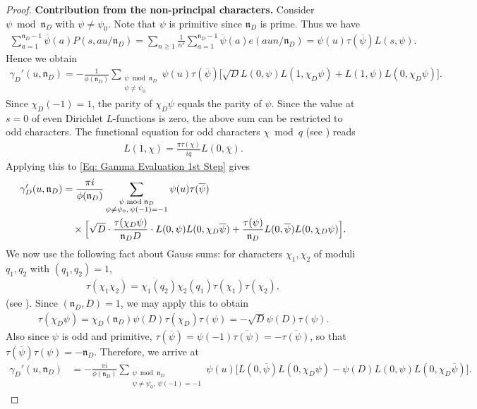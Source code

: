 \documentclass[11pt]{amsart}
\numberwithin{equation}{section}
\newcommand{\mf}{\mathfrak}
\newcommand{\ol}{\overline}
\newcommand{\n}{\mf{n}_D}
\theoremstyle{remark}
\begin{document}
\begin{proof}
\noindent \textbf{Contribution from the non-principal characters.} Consider $\psi \bmod \mf{n}_D$ with $\psi \neq \psi_0$. Note that $\psi$ is primitive since $\n$ is prime. Thus we have 
\begin{align}\label{Eq: Connecting P with Gauss Sums}
\sum_{a=1}^{\n-1}\ol{\psi}(a)P(s,au/\mf{n}_D)
=
\sum_{n\geq 1}\frac{1}{n^s}\sum_{a=1}^{\n-1}\ol{\psi}(a)e(aun/\n)
=
\psi(u)\tau(\ol{\psi})L(s,\psi).
\end{align}
Hence we obtain
\begin{align}\label{Eq: Gamma Evaluation 1st Step}
\gamma_D'(u,\mf{n}_D)=
-\frac{1}{\phi(\mf{n}_D)}\sum_{\substack{\psi \bmod \mf{n}_D \\ \psi \neq \psi_0}} \psi(u) \tau(\overline{\psi})\Big[\sqrt{D}L(0,\psi)L(1,\chi_D\psi)
+
L(1,\psi)L(0,\chi_D\psi)\Big].
\end{align}
Since $\chi_D(-1)=1$, the parity of $\chi_D\psi$ equals the parity of $\psi$. Since the value at $s=0$ of even Dirichlet $L$-functions is zero, the above sum can be restricted to odd characters. The functional equation for odd characters $\chi \bmod q$ (see \cite[Ch. 5]{IK2004}) reads
\begin{align}\label{General FE}
L(1,\chi)=\frac{\pi\tau(\chi)}{iq}L(0,\ol{\chi}).
\end{align}
Applying this to \eqref{Eq: Gamma Evaluation 1st Step} gives 
\begin{align}\label{Eq: Gamma Evaluation I}
\gamma_D'(u,\mf{n}_D)& =
\frac{\pi i}{\phi(\mf{n}_D)}\sum_{\substack{\psi \bmod \mf{n}_D \\ \psi \neq \psi_0, \,  \psi(-1)=-1}} \psi(u) \tau(\overline{\psi}) \notag \\
&\quad \times \Big[\sqrt{D} \cdot \frac{\tau(\chi_D\psi)}{\n D} \cdot L(0,\psi)L(0,\chi_D\overline{\psi})
+
\frac{\tau(\psi)}{\n} L(0,\overline{\psi})L(0,\chi_D\psi)\Big].
\end{align}
We now use the following fact about Gauss sums: for characters $\chi_1,\chi_2$ of moduli $q_1,q_2$ with $(q_1,q_2)=1$,
\begin{align}\label{Gauss Sum Factoring}
\tau(\chi_1\chi_2)=\chi_1(q_2)\chi_2(q_1)\tau(\chi_1)\tau(\chi_2),
\end{align}
(see \cite[Thm. 9.6]{MV}). Since $(\n,D)=1$, we may apply this to obtain
\begin{align*}
\tau(\chi_D\psi)=\chi_D(\n)\psi(D)\tau(\chi_D)\tau(\psi)=-\sqrt{D} \psi(D)\tau(\psi).
\end{align*}
Also since $\psi$ is odd and primitive, $\tau(\ol{\psi})=\psi(-1)\ol{\tau(\psi)}
=
-
\ol{\tau(\psi)}$, so that $\tau(\ol{\psi})\tau(\psi)=-\n$. Therefore, we arrive at
\begin{align}\label{Eq: Gamma Evaluation II}
\gamma_D'(u,\mf{n}_D)& =
-\frac{\pi i}{\phi(\mf{n}_D)}\sum_{\substack{\psi \bmod \mf{n}_D \\ \psi \neq \psi_0, \,  \psi(-1)=-1}} \psi(u) \Big[
L(0,\overline{\psi})L(0,\chi_D\psi)-\psi(D) L(0,\psi)L(0,\chi_D\overline{\psi})\Big].
\end{align}


\end{proof}
\end{document}
